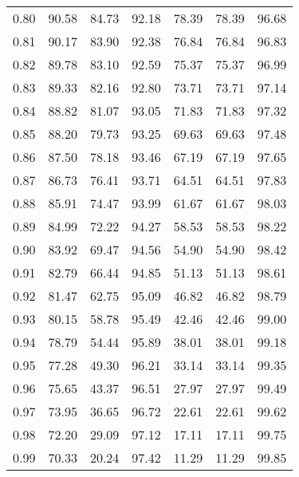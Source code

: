 \begin{tabular}{|c|c|c|c|c|c|c|}
      0.80 &     90.58 &     84.73 &      92.18 &   78.39 &      78.39 &         96.68 \\
      0.81 &     90.17 &     83.90 &      92.38 &   76.84 &      76.84 &         96.83 \\
      0.82 &     89.78 &     83.10 &      92.59 &   75.37 &      75.37 &         96.99 \\
      0.83 &     89.33 &     82.16 &      92.80 &   73.71 &      73.71 &         97.14 \\
      0.84 &     88.82 &     81.07 &      93.05 &   71.83 &      71.83 &         97.32 \\
      0.85 &     88.20 &     79.73 &      93.25 &   69.63 &      69.63 &         97.48 \\
      0.86 &     87.50 &     78.18 &      93.46 &   67.19 &      67.19 &         97.65 \\
      0.87 &     86.73 &     76.41 &      93.71 &   64.51 &      64.51 &         97.83 \\
      0.88 &     85.91 &     74.47 &      93.99 &   61.67 &      61.67 &         98.03 \\
      0.89 &     84.99 &     72.22 &      94.27 &   58.53 &      58.53 &         98.22 \\
      0.90 &     83.92 &     69.47 &      94.56 &   54.90 &      54.90 &         98.42 \\
      0.91 &     82.79 &     66.44 &      94.85 &   51.13 &      51.13 &         98.61 \\
      0.92 &     81.47 &     62.75 &      95.09 &   46.82 &      46.82 &         98.79 \\
      0.93 &     80.15 &     58.78 &      95.49 &   42.46 &      42.46 &         99.00 \\
      0.94 &     78.79 &     54.44 &      95.89 &   38.01 &      38.01 &         99.18 \\
      0.95 &     77.28 &     49.30 &      96.21 &   33.14 &      33.14 &         99.35 \\
      0.96 &     75.65 &     43.37 &      96.51 &   27.97 &      27.97 &         99.49 \\
      0.97 &     73.95 &     36.65 &      96.72 &   22.61 &      22.61 &         99.62 \\
      0.98 &     72.20 &     29.09 &      97.12 &   17.11 &      17.11 &         99.75 \\
      0.99 &     70.33 &     20.24 &      97.42 &   11.29 &      11.29 &         99.85 \\
\bottomrule
\end{tabular}
